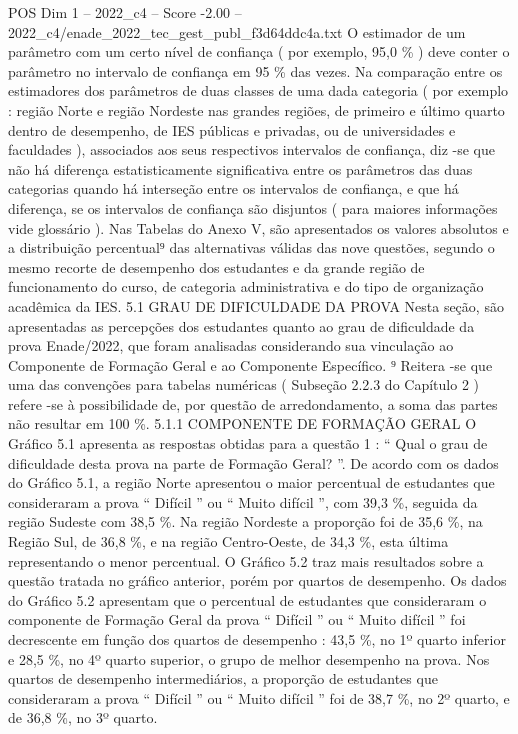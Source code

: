 \begin{textsample}{POS Dim 1 – 2022\_c4 – Score -2.00 – 2022\_c4/enade\_2022\_tec\_gest\_publ\_f3d64ddc4a.txt}
O estimador de um parâmetro com um certo nível de confiança ( por exemplo, 95,0 \% ) deve conter o parâmetro no intervalo de confiança em 95 \% das vezes.
Na comparação entre os estimadores dos parâmetros de duas classes de uma dada categoria ( por exemplo : região Norte e região Nordeste nas grandes regiões, de primeiro e último quarto dentro de desempenho, de IES públicas e privadas, ou de universidades e faculdades ), associados aos seus respectivos intervalos de confiança, diz -se que não há diferença estatisticamente significativa entre os parâmetros das duas categorias quando há interseção entre os intervalos de confiança, e que há diferença, se os intervalos de confiança são disjuntos ( para maiores informações vide glossário ).
Nas Tabelas do Anexo V, são apresentados os valores absolutos e a distribuição percentual⁹ das alternativas válidas das nove questões, segundo o mesmo recorte de desempenho dos estudantes e da grande região de funcionamento do curso, de categoria administrativa e do tipo de organização acadêmica da IES. 5.1 GRAU DE DIFICULDADE DA PROVA Nesta seção, são apresentadas as percepções dos estudantes quanto ao grau de dificuldade da prova Enade/2022, que foram analisadas considerando sua vinculação ao Componente de Formação Geral e ao Componente Específico. ⁹ Reitera -se que uma das convenções para tabelas numéricas ( Subseção 2.2.3 do Capítulo 2 ) refere -se à possibilidade de, por questão de arredondamento, a soma das partes não resultar em 100 \%. 5.1.1 COMPONENTE DE FORMAÇÃO GERAL O Gráfico 5.1 apresenta as respostas obtidas para a questão 1 : “ Qual o grau de dificuldade desta prova na parte de Formação Geral? ”.
De acordo com os dados do Gráfico 5.1, a região Norte apresentou o maior percentual de estudantes que consideraram a prova “ Difícil ” ou “ Muito difícil ”, com 39,3 \%, seguida da região Sudeste com 38,5 \%.
Na região Nordeste a proporção foi de 35,6 \%, na Região Sul, de 36,8 \%, e na região Centro-Oeste, de 34,3 \%, esta última representando o menor percentual.
O Gráfico 5.2 traz mais resultados sobre a questão tratada no gráfico anterior, porém por quartos de desempenho.
Os dados do Gráfico 5.2 apresentam que o percentual de estudantes que consideraram o componente de Formação Geral da prova “ Difícil ” ou “ Muito difícil ” foi decrescente em função dos quartos de desempenho : 43,5 \%, no 1º quarto inferior e 28,5 \%, no 4º quarto superior, o grupo de melhor desempenho na prova.
Nos quartos de desempenho intermediários, a proporção de estudantes que consideraram a prova “ Difícil ” ou “ Muito difícil ” foi de 38,7 \%, no 2º quarto, e de 36,8 \%, no 3º quarto.

\end{textsample}
